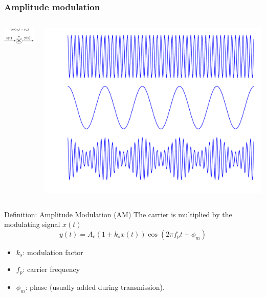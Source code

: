 \subsubsection{Amplitude modulation}

\begin{columns}
  \begin{column}{5cm}\centering
     \includegraphics[width=.45\linewidth]{imgs/fourier/modul_amplitude}
  \end{column}
  \begin{column}{5cm}
\includegraphics[width=.45\linewidth]{imgs/fourier/illustration_mod_ampl.pdf}
  \end{column}
\end{columns}
 

\begin{block}{Definition: Amplitude Modulation (AM)}
The carrier is multiplied by the modulating signal  $x(t)$ 
  \begin{equation*}
y(t)=A_c(1+k_sx(t))\cos(2\pi f_p t+\phi_m)
\end{equation*}
\vspace{-5mm}
\begin{itemize}
\item $k_s$: modulation factor
\item $f_p$: carrier frequency
\item $\phi_m$: phase (usually added during transmission).
\end{itemize}
\end{block}



